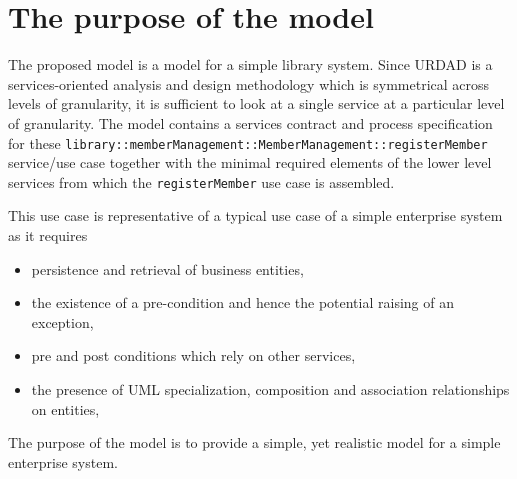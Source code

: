 \section{The purpose of the model}

The proposed model is a model for a simple library system. Since URDAD is a services-oriented analysis and
design methodology which is symmetrical across levels of granularity, it is sufficient to look at a single service
at a particular level of granularity. The model contains a services contract and process specification for these
\verb+library::memberManagement::MemberManagement::registerMember+ service/use case together with
the minimal required elements of the lower level services from which the \verb+registerMember+ use case
is assembled. 

This use case is representative of a typical use case of a simple enterprise system as it requires
\begin{itemize}
  \item persistence and retrieval of business entities,
  \item the existence of a pre-condition and hence the potential raising of an exception,
  \item pre and post conditions which rely on other services,
  \item the presence of UML specialization, composition and association relationships on entities,
\end{itemize}

The purpose of the model is to provide a simple, yet realistic model for a simple enterprise system. 

